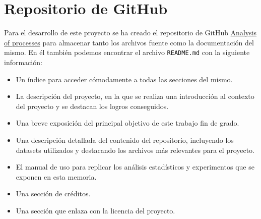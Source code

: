 \section{Repositorio de GitHub}

Para el desarrollo de este proyecto se ha creado el repositorio de GitHub \href{https://github.com/maribel00/Analysis-of-processes}{Analysis of processes} para almacenar tanto los archivos fuente como la documentación del mismo. En él también podemos encontrar el archivo \texttt{README.md} con la siguiente información:

\begin{itemize}
\item Un índice para acceder cómodamente a todas las secciones del mismo.
\item La descripción del proyecto, en la que se realiza una introducción al contexto del proyecto y se destacan los logros conseguidos.
\item Una breve exposición del principal objetivo de este trabajo fin de grado.
\item Una descripción detallada del contenido del repositorio, incluyendo los datasets utilizados y destacando los archivos más relevantes para el proyecto.
\item El manual de uso para replicar los análisis estadísticos y experimentos que se exponen en esta memoria.
\item Una sección de créditos.
\item Una sección que enlaza con la licencia del proyecto.
\end{itemize}